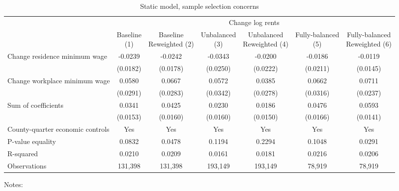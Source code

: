 \begin{table}
    \caption{Static model, sample selection concerns}
    \label{tab:static_sample}

    \begin{tabular}{@{}lcccccc@{}}
        \toprule
                                             & \multicolumn{6}{c}{Change log rents}                                     \\ \cmidrule(l){2-7} 
                                             & \shortstack{Baseline\\(1)}       & \shortstack{Baseline\\Reweighted (2)}
                                             & \shortstack{Unbalanced\\(3)}     & \shortstack{Unbalanced\\Reweighted (4)}
                                             & \shortstack{Fully-balanced\\(5)} & \shortstack{Fully-balanced\\Reweighted (6)}  \\ \midrule
        Change residence minimum wage        & -0.0239      & -0.0242        & -0.0343       & -0.0200      & -0.0186     & -0.0119            \\
                                             & (0.0182)    & (0.0178)      & (0.0250)     & (0.0222)    & (0.0211)   & (0.0145)          \\
        Change workplace minimum wage        & 0.0580      & 0.0667        & 0.0572       & 0.0385      & 0.0662     & 0.0711            \\
                                             & (0.0291)    & (0.0283)      & (0.0342)     & (0.0278)    & (0.0316)   & (0.0237)          \\ \midrule
        Sum of coefficients                  & 0.0341      & 0.0425        & 0.0230       & 0.0186      & 0.0476     &  0.0593           \\
                                             & (0.0153)    & (0.0160)      & (0.0160)     & (0.0150)    & (0.0166)   & (0.0141)          \\ \midrule
        County-quarter economic controls          & Yes      & Yes        & Yes       & Yes      & Yes     & Yes            \\
        P-value equality                     & 0.0832      & 0.0478        & 0.1194       & 0.2294      & 0.1048     & 0.0291            \\
        R-squared                            & 0.0210      & 0.0209        & 0.0161       & 0.0181      & 0.0216     & 0.0206            \\
        Observations                         & 131,398     & 131,398       & 193,149      & 193,149     & 78,919    & 78,919           \\ \bottomrule
    \end{tabular}

    \begin{minipage}{.95\textwidth} \footnotesize
        \vspace{2mm}
        Notes: 
    \end{minipage}
\end{table}
